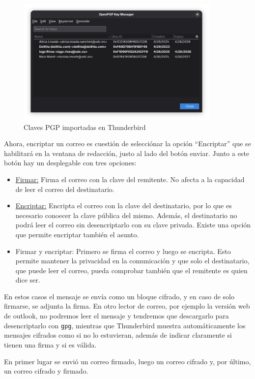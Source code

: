 \begin{figure}[H]
    \includegraphics[width=10cm]{thunderbird-keymanager-keys.png}
    \caption{Claves PGP importadas en Thunderbird}
\end{figure}

Ahora, encriptar un correo es cuestión de selecciónar la opción “Encriptar” que se habilitará en la ventana de redacción, justo al lado del botón enviar. Junto a este botón hay un desplegable con tres opciones:
\begin{itemize}
    \item{\underline{Firmar:} Firma el correo con la clave del remitente. No afecta a la capacidad de leer el correo del destinatario.}
    \item{\underline{Encriptar:} Encripta el correo con la clave del destinatario, por lo que es necesario conoecer la clave pública del mismo. Además, el destinatario no podrá leer el correo sin desencriptarlo con su clave privada. Existe una opción que permite encriptar también el asunto.}
    \item{Firmar y encriptar: Primero se firma el correo y luego se encripta. Esto permite mantener la privacidad en la comunicación y que solo el destinatario, que puede leer el correo, pueda comprobar también que el remitente es quien dice ser.}
\end{itemize}

En estos casos el mensaje se envía como un bloque cifrado, y en caso de solo firmarse, se adjunta la firma. En otro lector de correo, por ejemplo la versión web de outlook, no podremos leer el mensaje y tendremos que descargarlo para desencriptarlo con \texttt{gpg}, mientras que Thunderbird muestra automáticamente los mensajes cifrados como si no lo estuvieran, además de indicar claramente si tienen una firma y si es válida.

En primer lugar se envió un correo firmado, luego un correo cifrado y, por último, un correo cifrado y firmado.

